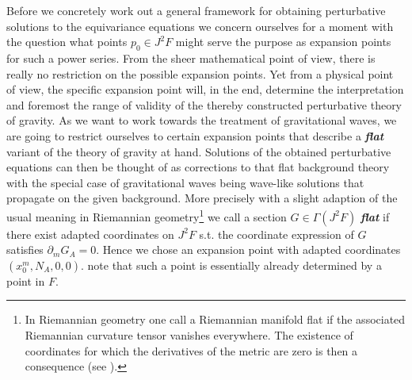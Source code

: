 Before we concretely work out a general framework for obtaining perturbative solutions to the equivariance equations we concern ourselves for a moment with the question what points $p_0 \in J^2F$ might serve the purpose as expansion points for such a power series. From the sheer mathematical point of view, there is really no restriction on the possible expansion points. Yet from a physical point of view, the specific expansion point will, in the end, determine the interpretation and foremost the range of validity of the thereby constructed perturbative theory of gravity. As we want to work towards the treatment of gravitational waves, we are going to restrict ourselves to certain expansion points that describe a \textit{\textbf{flat}} variant of the theory of gravity at hand. Solutions of the obtained perturbative equations can then be thought of as corrections to that flat background theory with the special case of gravitational waves being wave-like solutions that propagate on the given background. More precisely with a slight adaption of the usual meaning in Riemannian geometry\footnote{In Riemannian geometry one call a Riemannian manifold flat if the associated Riemannian curvature tensor vanishes everywhere. The existence of coordinates for which the derivatives of the metric are zero is then a consequence (see \cite{petersen2006riemannian}).} we call a section $G \in \Gamma(J^2F)$ \textit{\textbf{flat}} if there exist adapted coordinates on $J^2F$ s.t. the coordinate expression of $G$ satisfies $\partial_mG_{A}=0$.
Hence we chose an expansion point with adapted coordinates $(x_0^m,N_A,0,0)$. note that such a point is essentially already determined by a point in $F$. 


